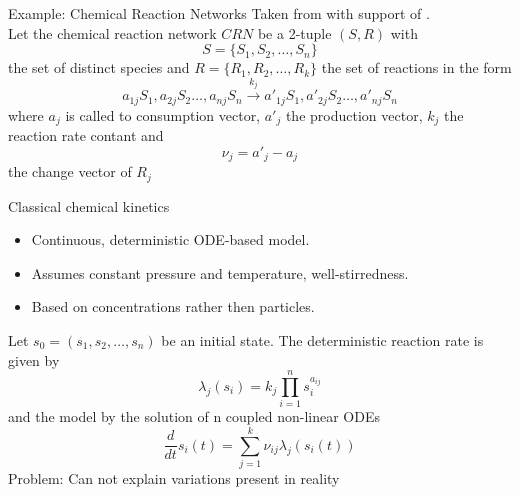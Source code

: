 \documentclass[rgb]{beamer}
\begin{document}
    
    
    \begin{frame}{Example: Chemical Reaction Networks}
        Taken from \autocite{mc_agg_crn} with support of \autocite{van1992stochastic}. \\
        Let the chemical reaction network $CRN$ be a 2-tuple $(S,R)$ with 
        \[S = \{S_1, S_2, \dots, S_n\}\] the set of distinct species and 
        $R = \{R_1, R_2, \dots, R_k\}$ the set of reactions in the form 
        \[ a_{1j} S_1, a_{2j} S_2 \dots, a_{nj} S_n \xrightarrow{k_j}  a'_{1j} S_1, a'_{2j} S_2 \dots, a'_{nj} S_n \]
        where $a_j$ is called to consumption vector, $a'_j$ the production vector, $k_j$ the reaction rate contant and 
        \[ \nu_j = a'_j - a_j \]
        the change vector of $R_j$
    \end{frame}
  
    \begin{frame}{Classical chemical kinetics}
        \begin{itemize}
            \item Continuous, deterministic ODE-based model.
            \item Assumes constant pressure and temperature, well-stirredness.
            \item Based on concentrations rather then particles.
        \end{itemize}
        \vskip 1cm
        Let $s_0 = (s_1, s_2, \dots, s_n)$ be an initial state. The deterministic reaction rate is given by 
            \[ \lambda_j (s_i) = k_j \prod_{i=1}^n s_i^{a_{ij}} \]
        and the model by the solution of n coupled non-linear ODEs
            \[ \frac{d}{dt} s_i(t) = \sum_{j = 1}^{k} \nu_{ij} \lambda_j (s_i(t))  \]
        \vfill
        Problem: Can not explain variations present in reality
    \end{frame}
    
\end{document}
